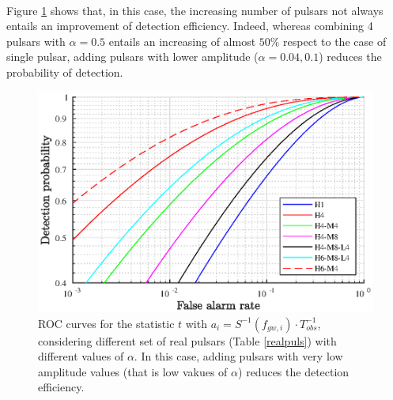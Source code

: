 \documentclass[11pt,a4paper,final]{iopart}
\begin{document}
\\Figure \ref{appt} shows that, in this case, the increasing number of pulsars not always entails an improvement of detection efficiency. Indeed, whereas combining 4 pulsars with $\alpha=0.5$ entails an increasing of almost $50\%$ respect to the case of single pulsar, adding pulsars with lower amplitude ($\alpha=0.04,0.1$) reduces the probability of detection. 
\begin{figure}[htpb!]
\centering
    \includegraphics[scale=0.85]{ROCt.eps}
    \caption{ROC curves for the statistic $t$ with $a_i=S^{-1}(f_{gw,i})\cdot T_{obs}^{-1}$, considering different set of real pulsars (Table \ref{realpuls}) with different values of $\alpha$. In this case, adding pulsars with very low amplitude values (that is low vakues of $\alpha$) reduces the detection efficiency.  }
    \label{appt}
     \vspace{-10pt}
\end{figure}
\end{document}
